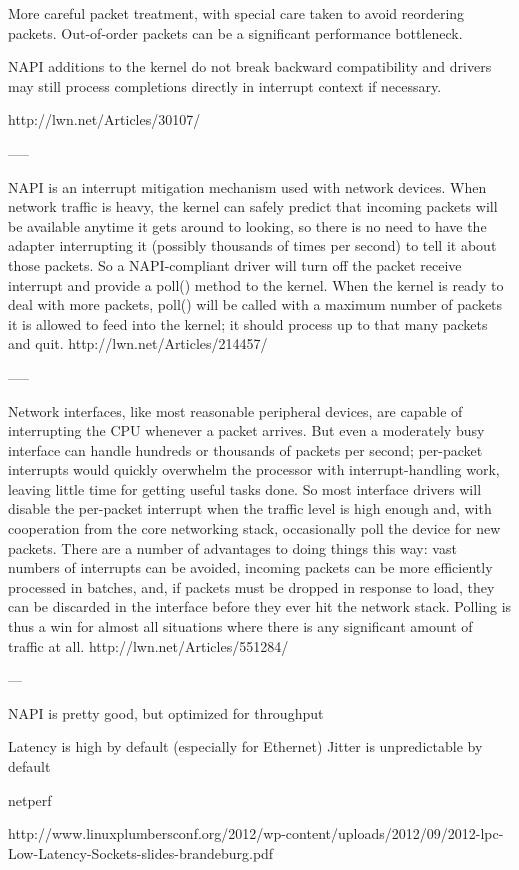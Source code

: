More careful packet treatment, with special care taken to avoid reordering packets. Out-of-order packets can be a significant performance bottleneck. 


NAPI additions to the kernel do not break backward compatibility and drivers may still process completions directly in interrupt context if necessary.

http://lwn.net/Articles/30107/

-----


NAPI is an interrupt mitigation mechanism used with network devices. When network traffic is heavy, the kernel can safely predict that incoming packets will be available anytime it gets around to looking, so there is no need to have the adapter interrupting it (possibly thousands of times per second) to tell it about those packets. So a NAPI-compliant driver will turn off the packet receive interrupt and provide a poll() method to the kernel. When the kernel is ready to deal with more packets, poll() will be called with a maximum number of packets it is allowed to feed into the kernel; it should process up to that many packets and quit.
http://lwn.net/Articles/214457/

-----

Network interfaces, like most reasonable peripheral devices, are capable of interrupting the CPU whenever a packet arrives. But even a moderately busy interface can handle hundreds or thousands of packets per second; per-packet interrupts would quickly overwhelm the processor with interrupt-handling work, leaving little time for getting useful tasks done. So most interface drivers will disable the per-packet interrupt when the traffic level is high enough and, with cooperation from the core networking stack, occasionally poll the device for new packets. There are a number of advantages to doing things this way: vast numbers of interrupts can be avoided, incoming packets can be more efficiently processed in batches, and, if packets must be dropped in response to load, they can be discarded in the interface before they ever hit the network stack. Polling is thus a win for almost all situations where there is any significant amount of traffic at all. 
http://lwn.net/Articles/551284/

---

NAPI is pretty good, but optimized for throughput

Latency is high by default (especially for Ethernet)
Jitter is unpredictable by default

netperf

http://www.linuxplumbersconf.org/2012/wp-content/uploads/2012/09/2012-lpc-Low-Latency-Sockets-slides-brandeburg.pdf
